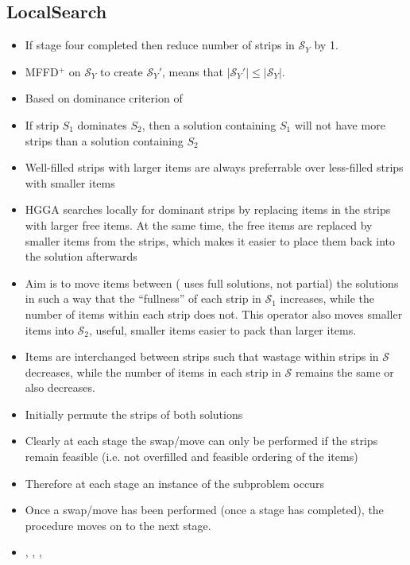 \documentclass{elsarticle}
\begin{document}
\subsection{LocalSearch}
\begin{itemize}
	\item If stage four completed then reduce number of strips in $\mathcal{S}_Y$ by 1.
	\item MFFD$^+$ on $\mathcal{S}_Y$ to create $\mathcal{S}_Y'$, means that $|\mathcal{S}_Y'| \leq |\mathcal{S}_Y|$.
	\item Based on dominance criterion of \cite{martello1990l}
	\item If strip $S_1$ dominates $S_2$, then a solution containing $S_1$ will not have more strips than a solution containing $S_2$
	\item Well-filled strips with larger items are always preferrable over less-filled strips with smaller items \cite{levine2004}
	\item HGGA \cite{falkenauer1996} searches locally for dominant strips by replacing items in the strips with larger free items. At the same time, the free items are replaced by smaller items from the strips, which makes it easier to place them back into the solution afterwards
	\item Aim is to move items between (\cite{lewis2009} uses full solutions, not partial) the solutions in such a way that the ``fullness'' of each strip in $\mathcal{S}_1$ increases, while the number of items within each strip does not. This operator also moves smaller items into $\mathcal{S}_2$, useful, smaller items easier to pack than larger items.
	\item Items are interchanged between strips such that wastage within strips in $\mathcal{S}$ decreases, while the number of items in each strip in $\mathcal{S}$ remains the same or also decreases. \cite{lewis2017}
	\item Initially permute the strips of both solutions
	\item Clearly at each stage the swap/move can only be performed if the strips remain feasible (i.e. not overfilled and feasible ordering of the items)
	\item Therefore at each stage an instance of the subproblem occurs
	\item Once a swap/move has been performed (once a stage has completed), the procedure moves on to the next stage.
	\item \cite{lewis2009}, \cite{levine2004}, \cite{falkenauer1996}, \cite{martello1990l}

\end{itemize}
\end{document}
